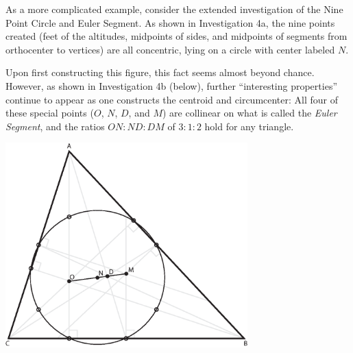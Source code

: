 As a more complicated example, consider the extended investigation of
the Nine Point Circle and Euler Segment.  As shown in Investigation
4a, the nine points created (feet of the altitudes, midpoints of
sides, and midpoints of segments from orthocenter to vertices) are all
concentric, lying on a circle with center labeled $N$.

Upon first constructing this figure, this fact seems almost beyond
chance.  However, as shown in Investigation 4b (below), further
``interesting properties'' continue to appear as one constructs the
centroid and circumcenter: All four of these special points ($O$, $N$,
$D$, and $M$) are collinear on what is called the \emph{Euler
  Segment}, and the ratios $ON:ND:DM$ of $3:1:2$ hold for any
triangle.

\begin{center}
\includegraphics[width=0.7\textwidth]{diagrams/euler-line.eps}
\end{center}

